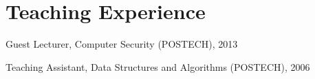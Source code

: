 \section*{Teaching Experience}
\begin{description}

\item Guest Lecturer, Computer Security (POSTECH), 2013

\item Teaching Assistant, Data Structures and Algorithms (POSTECH), 2006

\end{description}
